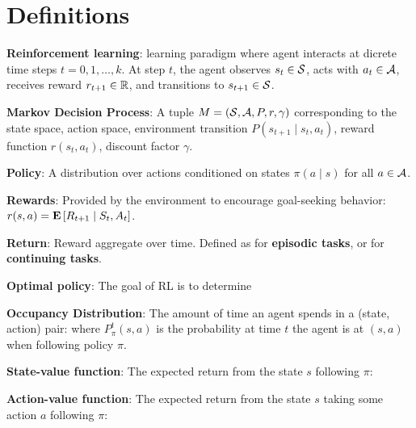 \documentclass{article}
\begin{document}
\section{Definitions}
\textbf{Reinforcement learning}: learning paradigm where agent interacts at dicrete time steps $t=0,1,\dots,k$. At step $t$, the agent observes $s_t\in\mathcal{S}$, acts with $a_t\in\mathcal{A}$, receives reward $r_{t+1}\in\mathbb{R}$, and transitions to $s_{t+1}\in\mathcal{S}$.

  \textbf{Markov Decision Process}: A tuple $M=(\mathcal{S}, \mathcal{A}, P, r, \gamma)$ corresponding to the state space, action space, environment transition $P(s_{t+1}\mid s_t,a_t)$, reward function $r(s_t,a_t)$, discount factor $\gamma$.

  \textbf{Policy}: A distribution over actions conditioned on states $\pi(a\mid s)$ for all $a\in\mathcal{A}$.

  \textbf{Rewards}: Provided by the environment to encourage goal-seeking behavior: $r(s,a)=\mathbf{E}\left[ R_{t+1}\mid S_t,A_t \right]$. 

  \textbf{Return}: Reward aggregate over time. Defined as
  for \textbf{episodic tasks}, or
  for \textbf{continuing tasks}. 

  \textbf{Optimal policy}: The goal of RL is to determine

  \textbf{Occupancy Distribution}: The amount of time an agent spends in a (state, action) pair:
  where $P_\pi^t(s,a)$ is the probability at time $t$ the agent is at $(s,a)$ when following policy $\pi$. 

  \textbf{State-value function}: The expected return from the state $s$ following $\pi$:

  \textbf{Action-value function}: The expected return from the state $s$ taking some action $a$ following $\pi$:
\end{document}
